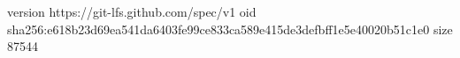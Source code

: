 version https://git-lfs.github.com/spec/v1
oid sha256:e618b23d69ea541da6403fe99ce833ca589e415de3defbff1e5e40020b51c1e0
size 87544
